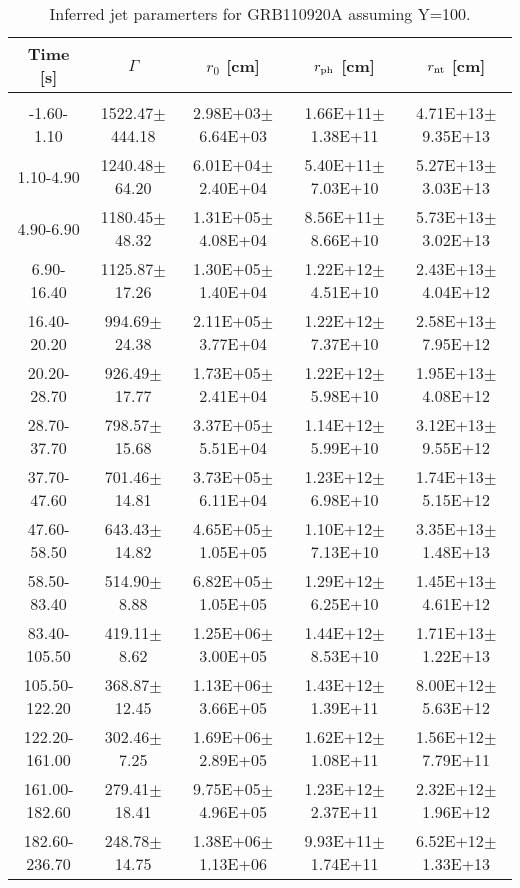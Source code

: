 \begin{table}[htp]
\scriptsize
\label{tab:}
\begin{tabular}{c c c c c}
Time [s] & $\Gamma$ & $r_0$ [cm] & $r_{\rm ph}$ [cm] & $r_{\rm nt}$ [cm] \\
\hline \hline\\ 

-1.60-1.10 & 1522.47$\pm$444.18 & 2.98E+03$\pm$6.64E+03 & 1.66E+11$\pm$1.38E+11 & 4.71E+13$\pm$9.35E+13 \\ 

1.10-4.90 & 1240.48$\pm$64.20 & 6.01E+04$\pm$2.40E+04 & 5.40E+11$\pm$7.03E+10 & 5.27E+13$\pm$3.03E+13 \\ 

4.90-6.90 & 1180.45$\pm$48.32 & 1.31E+05$\pm$4.08E+04 & 8.56E+11$\pm$8.66E+10 & 5.73E+13$\pm$3.02E+13 \\ 

6.90-16.40 & 1125.87$\pm$17.26 & 1.30E+05$\pm$1.40E+04 & 1.22E+12$\pm$4.51E+10 & 2.43E+13$\pm$4.04E+12 \\ 

16.40-20.20 & 994.69$\pm$24.38 & 2.11E+05$\pm$3.77E+04 & 1.22E+12$\pm$7.37E+10 & 2.58E+13$\pm$7.95E+12 \\ 

20.20-28.70 & 926.49$\pm$17.77 & 1.73E+05$\pm$2.41E+04 & 1.22E+12$\pm$5.98E+10 & 1.95E+13$\pm$4.08E+12 \\ 

28.70-37.70 & 798.57$\pm$15.68 & 3.37E+05$\pm$5.51E+04 & 1.14E+12$\pm$5.99E+10 & 3.12E+13$\pm$9.55E+12 \\ 

37.70-47.60 & 701.46$\pm$14.81 & 3.73E+05$\pm$6.11E+04 & 1.23E+12$\pm$6.98E+10 & 1.74E+13$\pm$5.15E+12 \\ 

47.60-58.50 & 643.43$\pm$14.82 & 4.65E+05$\pm$1.05E+05 & 1.10E+12$\pm$7.13E+10 & 3.35E+13$\pm$1.48E+13 \\ 

58.50-83.40 & 514.90$\pm$8.88 & 6.82E+05$\pm$1.05E+05 & 1.29E+12$\pm$6.25E+10 & 1.45E+13$\pm$4.61E+12 \\ 

83.40-105.50 & 419.11$\pm$8.62 & 1.25E+06$\pm$3.00E+05 & 1.44E+12$\pm$8.53E+10 & 1.71E+13$\pm$1.22E+13 \\ 

105.50-122.20 & 368.87$\pm$12.45 & 1.13E+06$\pm$3.66E+05 & 1.43E+12$\pm$1.39E+11 & 8.00E+12$\pm$5.63E+12 \\ 

122.20-161.00 & 302.46$\pm$7.25 & 1.69E+06$\pm$2.89E+05 & 1.62E+12$\pm$1.08E+11 & 1.56E+12$\pm$7.79E+11 \\ 

161.00-182.60 & 279.41$\pm$18.41 & 9.75E+05$\pm$4.96E+05 & 1.23E+12$\pm$2.37E+11 & 2.32E+12$\pm$1.96E+12 \\ 

182.60-236.70 & 248.78$\pm$14.75 & 1.38E+06$\pm$1.13E+06 & 9.93E+11$\pm$1.74E+11 & 6.52E+12$\pm$1.33E+13 \\ 

\end{tabular}
\caption{Inferred jet paramerters for GRB110920A assuming Y=100.}
\end{table}
